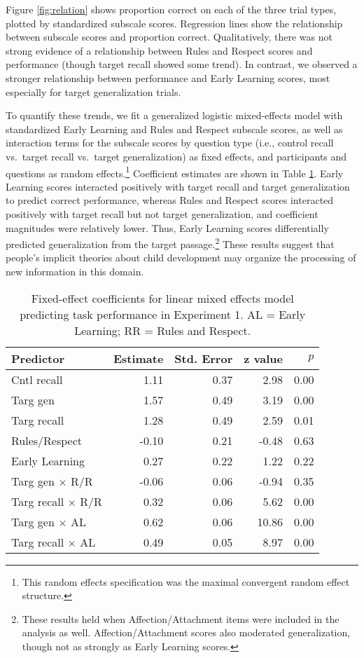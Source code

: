 \documentclass[10pt, letterpaper]{article}
\begin{document}
Figure \ref{fig:relation} shows proportion correct on each of the three
trial types, plotted by standardized subscale scores. Regression lines
show the relationship between subscale scores and proportion correct.
Qualitatively, there was not strong evidence of a relationship between
Rules and Respect scores and performance (though target recall showed
some trend). In contrast, we observed a stronger relationship between
performance and Early Learning scores, most especially for target
generalization trials.

To quantify these trends, we fit a generalized logistic mixed-effects
model with standardized Early Learning and Rules and Respect subscale
scores, as well as interaction terms for the subscale scores by question
type (i.e., control recall vs.~target recall vs.~target generalization)
as fixed effects, and participants and questions as random
effects.\footnote{This random effects specification was the maximal
  convergent random effect structure.} Coefficient estimates are shown
in Table \ref{tab:lmer}. Early Learning scores interacted positively
with target recall and target generalization to predict correct
performance, whereas Rules and Respect scores interacted positively with
target recall but not target generalization, and coefficient magnitudes
were relatively lower. Thus, Early Learning scores differentially
predicted generalization from the target passage.\footnote{These results
  held when Affection/Attachment items were included in the analysis as
  well. Affection/Attachment scores also moderated generalization,
  though not as strongly as Early Learning scores.} These results
suggest that people's implicit theories about child development may
organize the processing of new information in this domain.

\begin{table}[t]
\centering
\begin{tabular}{lrrrr}
  \hline
Predictor & Estimate & Std. Error & z value & $p$ \\ 
  \hline
  Cntl recall & 1.11 & 0.37 & 2.98 & 0.00 \\ 
  Targ gen & 1.57 & 0.49 & 3.19 & 0.00 \\ 
  Targ recall & 1.28 & 0.49 & 2.59 & 0.01 \\ 
  Rules/Respect & -0.10 & 0.21 & -0.48 & 0.63 \\ 
  Early Learning & 0.27 & 0.22 & 1.22 & 0.22 \\ 
  Targ gen $\times$ R/R & -0.06 & 0.06 & -0.94 & 0.35 \\ 
  Targ recall $\times$ R/R& 0.32 & 0.06 & 5.62 & 0.00 \\ 
  Targ gen $\times$ AL & 0.62 & 0.06 & 10.86 & 0.00 \\ 
  Targ recall $\times$ AL & 0.49 & 0.05 & 8.97 & 0.00 \\ 
   \hline
\end{tabular}
\caption{Fixed-effect coefficients for linear mixed effects model predicting task performance in Experiment 1. AL = Early Learning; RR = Rules and Respect.\label{tab:lmer}} 
\end{table}
\end{document}
